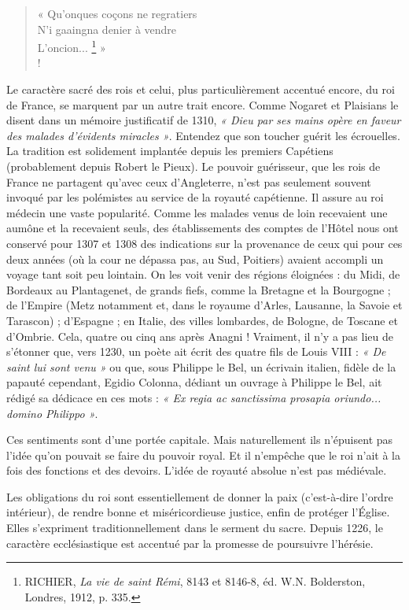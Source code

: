 \documentclass[french,twoside]{book} %
\begin{document}
\begin{verse}
« Qu’onques coçons ne regratiers\\
N’i gaaingna denier à vendre\\
L’oncion... \footnote{ RICHIER, {\itshape La vie de saint Rémi}, 8143 et 8146-8, éd. W.N. Bolderston, Londres, 1912, p. 335.} »\\!
\end{verse}
\noindent Le caractère sacré des rois et celui, plus particulièrement accentué encore, du roi de France, se marquent par un autre trait encore. Comme Nogaret et Plaisians le disent dans un mémoire  
\label{p18} justificatif de 1310, \emph{« Dieu par ses mains opère en faveur des malades d’évidents miracles »}. Entendez que son toucher guérit les écrouelles. La tradition est solidement implantée depuis les premiers Capétiens (probablement depuis Robert le Pieux). Le pouvoir guérisseur, que les rois de France ne partagent qu’avec ceux d’Angleterre, n’est pas seulement souvent invoqué par les polémistes au service de la royauté capétienne. Il assure au roi médecin une vaste popularité. Comme les malades venus de loin recevaient une aumône et la recevaient seuls, des établissements des comptes de l’Hôtel nous ont conservé pour 1307 et 1308 des indications sur la provenance de ceux qui pour ces deux années (où la cour ne dépassa pas, au Sud, Poitiers) avaient accompli un voyage tant soit peu lointain. On les voit venir des régions éloignées : du Midi, de Bordeaux au Plantagenet, de grands fiefs, comme la Bretagne et la Bourgogne ; de l’Empire (Metz notamment et, dans le royaume d’Arles, Lausanne, la Savoie et Tarascon) ; d’Espagne ; en Italie, des villes lombardes, de Bologne, de Toscane et d’Ombrie. Cela, quatre ou cinq ans après Anagni ! Vraiment, il n’y a pas lieu de s’étonner que, vers 1230, un poète ait écrit des quatre fils de Louis VIII : \emph{« De saint lui sont venu »} ou que, sous Philippe le Bel, un écrivain italien, fidèle de la papauté cependant, Egidio Colonna, dédiant un ouvrage à Philippe le Bel, ait rédigé sa dédicace en ces mots : \emph{« Ex regia ac sanctissima prosapia oriundo... domino Philippo »}.\par
Ces sentiments sont d’une portée capitale. Mais naturellement ils n’épuisent pas l’idée qu’on pouvait se faire du pouvoir royal. Et il n’empêche que le roi n’ait à la fois des fonctions et des devoirs. L’idée de royauté absolue n’est pas médiévale.\par
Les obligations du roi sont essentiellement de donner la paix (c’est-à-dire l’ordre intérieur), de rendre bonne et miséricordieuse justice, enfin de protéger l’Église. Elles s’expriment traditionnellement dans le serment du sacre. Depuis 1226, le caractère ecclésiastique est accentué par la promesse de poursuivre l’hérésie.\par
\end{document}
